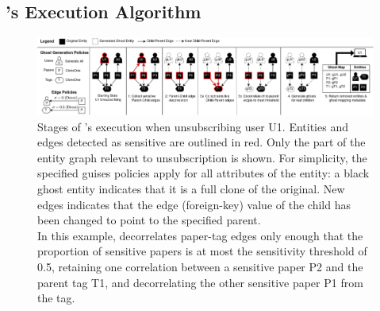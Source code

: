 \subsection{\sys's Execution Algorithm}
\begin{figure}[ht!]
    \centering
    \includegraphics[width=\textwidth]{img/algo}

    \caption{Stages of \sys's execution when unsubscribing user U1. Entities and edges detected as
    sensitive are outlined in red. Only the part of the entity graph relevant to unsubscription is shown.
    For simplicity, the specified guises policies apply for all attributes
    of the entity: a black ghost entity indicates that it is a full clone of the original.
    New edges indicates that the edge (foreign-key) value of the child has been changed to
    point to the specified parent.\\
    In this example, \sys decorrelates paper-tag edges only enough that the proportion of sensitive papers
    is at most the sensitivity threshold of 0.5, retaining one correlation between a sensitive
    paper P2 and the parent tag T1, and decorrelating the other sensitive paper P1 from the tag.}
    \label{fig:algo}
\end{figure}


